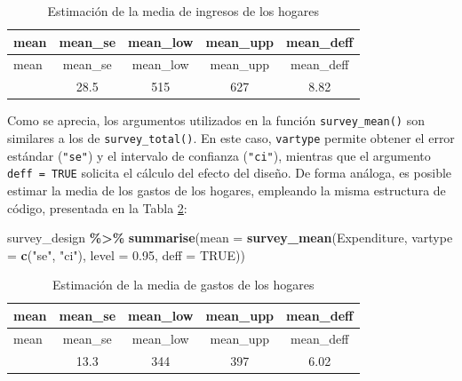 \documentclass[
  spanish,
  12pt,
]{book}
\newenvironment{Shaded}{\begin{snugshade}}{\end{snugshade}}
\newcommand{\AttributeTok}[1]{\textcolor[rgb]{0.13,0.29,0.53}{#1}}
\newcommand{\ConstantTok}[1]{\textcolor[rgb]{0.56,0.35,0.01}{#1}}
\newcommand{\FloatTok}[1]{\textcolor[rgb]{0.00,0.00,0.81}{#1}}
\newcommand{\FunctionTok}[1]{\textcolor[rgb]{0.13,0.29,0.53}{\textbf{#1}}}
\newcommand{\NormalTok}[1]{#1}
\newcommand{\SpecialCharTok}[1]{\textcolor[rgb]{0.81,0.36,0.00}{\textbf{#1}}}
\newcommand{\StringTok}[1]{\textcolor[rgb]{0.31,0.60,0.02}{#1}}
\begin{document}
\begin{longtable}[]{@{}lcccc@{}}
\caption{\label{tab:tab-media-ingreso}Estimación de la media de ingresos de los hogares}\tabularnewline
\toprule\noalign{}
mean & mean\_se & mean\_low & mean\_upp & mean\_deff \\
\midrule\noalign{}
\endfirsthead
\toprule\noalign{}
mean & mean\_se & mean\_low & mean\_upp & mean\_deff \\
\midrule\noalign{}
\endhead
\bottomrule\noalign{}
\endlastfoot
571 & 28.5 & 515 & 627 & 8.82 \\
\end{longtable}

Como se aprecia, los argumentos utilizados en la función \texttt{survey\_mean()} son similares a los de \texttt{survey\_total()}. En este caso, \texttt{vartype} permite obtener el error estándar (\texttt{"se"}) y el intervalo de confianza (\texttt{"ci"}), mientras que el argumento \texttt{deff\ =\ TRUE} solicita el cálculo del efecto del diseño. De forma análoga, es posible estimar la media de los gastos de los hogares, empleando la misma estructura de código, presentada en la Tabla \ref{tab:tab-media-gasto}:

\begin{Shaded}
\begin{Highlighting}[]
\NormalTok{survey\_design }\SpecialCharTok{\%\textgreater{}\%}
  \FunctionTok{summarise}\NormalTok{(}\AttributeTok{mean =} \FunctionTok{survey\_mean}\NormalTok{(Expenditure,}
                                    \AttributeTok{vartype =} \FunctionTok{c}\NormalTok{(}\StringTok{"se"}\NormalTok{, }\StringTok{"ci"}\NormalTok{),}
                                    \AttributeTok{level =} \FloatTok{0.95}\NormalTok{,}
                                    \AttributeTok{deff =} \ConstantTok{TRUE}\NormalTok{))}
\end{Highlighting}
\end{Shaded}

\begin{longtable}[]{@{}lcccc@{}}
\caption{\label{tab:tab-media-gasto}Estimación de la media de gastos de los hogares}\tabularnewline
\toprule\noalign{}
mean & mean\_se & mean\_low & mean\_upp & mean\_deff \\
\midrule\noalign{}
\endfirsthead
\toprule\noalign{}
mean & mean\_se & mean\_low & mean\_upp & mean\_deff \\
\midrule\noalign{}
\endhead
\bottomrule\noalign{}
\endlastfoot
371 & 13.3 & 344 & 397 & 6.02 \\
\end{longtable}
\end{document}
